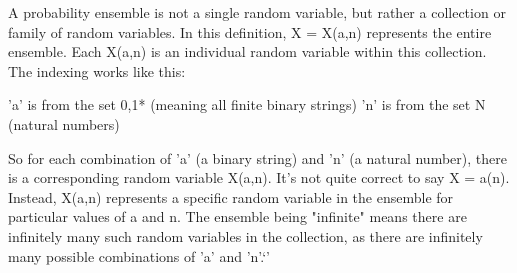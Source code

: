 A probability ensemble is not a single random variable, but rather a collection or family of random variables.
In this definition, X = {X(a,n)} represents the entire ensemble. Each X(a,n) is an individual random variable within this collection.
The indexing works like this:

'a' is from the set {0,1}* (meaning all finite binary strings)
'n' is from the set N (natural numbers)


So for each combination of 'a' (a binary string) and 'n' (a natural number), there is a corresponding random variable X(a,n).
It's not quite correct to say X = a(n). Instead, X(a,n) represents a specific random variable in the ensemble for particular values of a and n.
The ensemble being "infinite" means there are infinitely many such random variables in the collection, as there are infinitely many possible combinations of 'a' and 'n'.`'